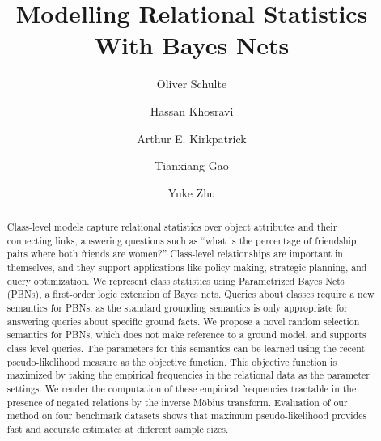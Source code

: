 \documentclass[oribibl]{llncs}
\begin{document}

\newcommand{\theHalgorithm}{\arabic{algorithm}}

\title{Modelling Relational Statistics With Bayes Nets}


\author{Oliver Schulte \and Hassan Khosravi \and Arthur E. Kirkpatrick \and Tianxiang Gao \and Yuke Zhu}
\maketitle  


\begin{abstract} 
Class-level models capture relational statistics over object attributes and their connecting links, answering questions such as ``what is the percentage of friendship pairs where both friends are women?'' Class-level relationships are important in themselves, and they support applications like policy making, strategic planning, and query optimization. We represent class statistics using Parametrized Bayes Nets (PBNs), a first-order logic extension of Bayes nets. Queries about classes require a new semantics for PBNs, as the standard grounding semantics is only appropriate for answering queries about specific ground facts. We propose a novel random selection semantics for PBNs, which does not make reference to a ground model, and supports class-level queries.
The parameters for this semantics can be learned using the recent  pseudo-likelihood measure \cite{Schulte2011} as the objective function. This objective function is maximized by taking the empirical frequencies in the relational data as the parameter settings. We render the computation of these empirical frequencies tractable in the presence of negated relations by the inverse M\"obius transform. Evaluation of our method on four benchmark datasets shows that maximum pseudo-likelihood provides fast and accurate estimates at different sample sizes.  
\end{abstract}
\end{document}
